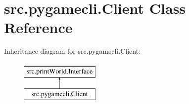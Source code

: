 \hypertarget{classsrc_1_1pygamecli_1_1_client}{}\section{src.\+pygamecli.\+Client Class Reference}
\label{classsrc_1_1pygamecli_1_1_client}
Inheritance diagram for src.\+pygamecli.\+Client\+:\begin{figure}[H]
\begin{center}
\leavevmode
\includegraphics[height=2.000000cm]{classsrc_1_1pygamecli_1_1_client}
\end{center}
\end{figure}
